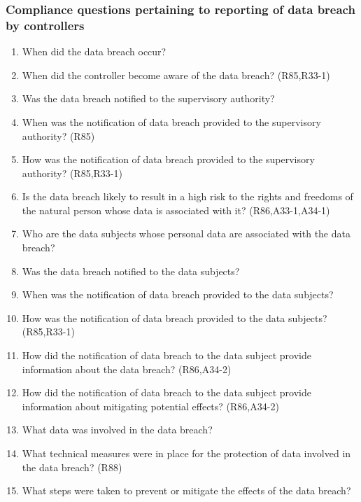 \subsubsection{Compliance questions pertaining to reporting of data breach by controllers}\label{sec:info:CQ:8}
\begin{enumerate}[label={\textit{CMQ.\theenumi}},resume]
    \item When did the data breach occur?
    \item When did the controller become aware of the data breach? (R85,R33-1)
    \item Was the data breach notified to the supervisory authority?
    \item When was the notification of data breach provided to the supervisory authority? (R85)
    \item How was the notification of data breach provided to the supervisory authority? (R85,R33-1)
    \item Is the data breach likely to result in a high risk to the rights and freedoms of the natural person whose data is associated with it? (R86,A33-1,A34-1)
    \item Who are the data subjects whose personal data are associated with the data breach?
    \item Was the data breach notified to the data subjects?
    \item When was the notification of data breach provided to the data subjects?
    \item How was the notification of data breach provided to the data subjects? (R85,R33-1)
    \item How did the notification of data breach to the data subject provide information about the data breach? (R86,A34-2)
    \item How did the notification of data breach to the data subject provide information about mitigating potential effects? (R86,A34-2)
    \item What data was involved in the data breach?
    \item What technical measures were in place for the protection of data involved in the data breach? (R88)
    \item What steps were taken to prevent or mitigate the effects of the data breach?
\end{enumerate}

